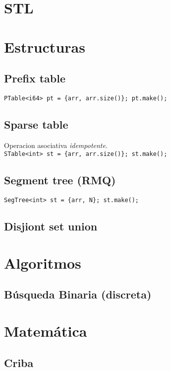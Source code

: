 

\def\title{Notebook (largo)}
\tableofcontents\newpage
 
\section{STL}
    

\section{Estructuras}
    \subsection{Prefix table}
        \texttt{PTable<i64> pt = \{arr, arr.size()\}; pt.make();}
    \subsection{Sparse table}
    Operacion asociativa \emph{idempotente}. \\
    \texttt{STable<int> st = \{arr, arr.size()\}; st.make();}
    \subsection{Segment tree (RMQ)}
        \texttt{SegTree<int> st = \{arr, N\}; st.make();}
    \subsection{Disjiont set union}

\section{Algoritmos}
    \subsection{Búsqueda Binaria (discreta)}

\section{Matemática}
    \subsection{Criba}

